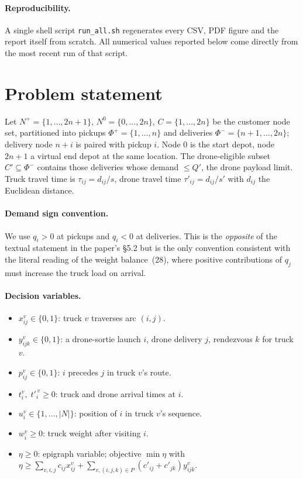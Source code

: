 \documentclass[11pt,a4paper]{article}
\newcommand{\Nplus}{N^{+}}
\newcommand{\NO}{N^{0}}
\newcommand{\Cprime}{C'}
\begin{document}
\paragraph{Reproducibility.}
A single shell script \texttt{run\_all.sh} regenerates every CSV, PDF
figure and the report itself from scratch. All numerical values reported
below come directly from the most recent run of that script.

\section{Problem statement}

Let $\Nplus = \{1,\dots,2n+1\}$, $\NO = \{0,\dots,2n\}$, $C =
\{1,\dots,2n\}$ be the customer node set, partitioned into pickups
$\Phi^{+} = \{1,\dots,n\}$ and deliveries $\Phi^{-} = \{n{+}1,\dots,2n\}$;
delivery node $n{+}i$ is paired with pickup $i$. Node $0$ is the start
depot, node $2n{+}1$ a virtual end depot at the same location. The
drone-eligible subset $\Cprime \subseteq \Phi^{-}$ contains those
deliveries whose demand $\le Q'$, the drone payload limit. Truck travel
time is $\tau_{ij} = d_{ij}/s$, drone travel time $\tau'_{ij} = d_{ij}/s'$
with $d_{ij}$ the Euclidean distance.

\paragraph{Demand sign convention.}
We use $q_i > 0$ at pickups and $q_i < 0$ at deliveries. This is the
\emph{opposite} of the textual statement in the paper's \S5.2 but is the
only convention consistent with the literal reading of the weight
balance~(28), where positive contributions of $q_j$ must increase the
truck load on arrival.

\paragraph{Decision variables.}
\begin{itemize}
\item $x^{v}_{ij}\in\{0,1\}$: truck $v$ traverses arc $(i,j)$.
\item $y^{v}_{ijk}\in\{0,1\}$: a drone-sortie launch $i$, drone delivery
$j$, rendezvous $k$ for truck $v$.
\item $p^{v}_{ij}\in\{0,1\}$: $i$ precedes $j$ in truck $v$'s route.
\item $t^{v}_{i},\;t'^{\,v}_{i}\ge 0$: truck and drone arrival times at $i$.
\item $u^{v}_{i}\in\{1,\dots,|N|\}$: position of $i$ in truck $v$'s
sequence.
\item $w^{v}_{i}\ge 0$: truck weight after visiting $i$.
\item $\eta\ge 0$: epigraph variable; objective $\min \eta$ with $\eta \ge
\sum_{v,i,j} c_{ij}x^{v}_{ij} + \sum_{v,(i,j,k)\in P}
(c'_{ij}{+}c'_{jk}) y^{v}_{ijk}$.
\end{itemize}
\end{document}
